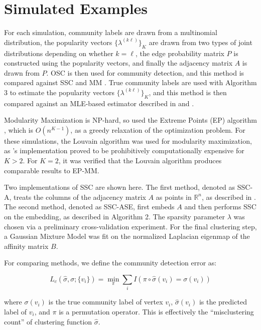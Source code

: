 \documentclass[12pt]{article}
\begin{document}
\hypertarget{simulated-examples}{%
\section{Simulated Examples}\label{simulated-examples}}

For each simulation, community labels are drawn from a multinomial
distribution, the popularity vectors \(\{\lambda^{(k \ell)}\}_K\) are drawn
from two types of joint distributions depending on whether \(k = \ell\),
the edge probability matrix \(P\) is constructed using the popularity
vectors, and finally the adjacency matrix \(A\)
is drawn from \(P\). OSC is then used for community detection, and this
method is compared against SSC \cite{noroozi2019estimation,soltanolkotabi2014}
and MM \cite{igraph, 307cbeb9b1be48299388437423d94bf1}. 
True community labels are used
with Algorithm 3 to estimate the popularity vectors
\(\{\lambda^{(k \ell)}\}_K\), and this method is then compared against an
MLE-based estimator described in \cite{noroozi2019estimation} and
\cite{307cbeb9b1be48299388437423d94bf1}.

Modularity Maximization is NP-hard, so
\citet{307cbeb9b1be48299388437423d94bf1} used the Extreme Points
(EP) algorithm \cite{le2016}, which is \(O(n^{K - 1})\), as a greedy
relaxation of the optimization problem. For these simulations, the
Louvain algorithm was used for modularity maximization,
as \citet{307cbeb9b1be48299388437423d94bf1}'s implementation proved to be
prohibitively computationally expensive for \(K > 2\). For \(K = 2\), it
was verified that the Louvain algorithm produces comparable results
to EP-MM.

Two implementations of SSC are shown here. The first method, denoted as
SSC-A, treats the columns of the adjacency matrix \(A\) as points in
\(\mathbb{R}^n\), as described in \citet{noroozi2019estimation}.
The second method, denoted as SSC-ASE, first embeds \(A\) and then
performs SSC on the embedding, as described in Algorithm 2. The sparsity
parameter \(\lambda\) was chosen via a preliminary cross-validation
experiment. For the final clustering step, a Gaussian Mixture Model was
fit on the normalized Laplacian eigenmap of the affinity matrix \(B\).

For comparing methods, we define the community detection error as:

\[L_c(\hat{\sigma}, \sigma; \{v_i\}) =
\min_\pi \sum_i I(\pi \circ \hat{\sigma}(v_i) = \sigma(v_i))\]

where \(\sigma(v_i)\) is the true community label of vertex \(v_i\),
\(\hat{\sigma}(v_i)\) is the predicted label of \(v_i\), and \(\pi\) is
a permutation operator. This is effectively the ``misclustering count''
of clustering function \(\hat{\sigma}\).
\end{document}
